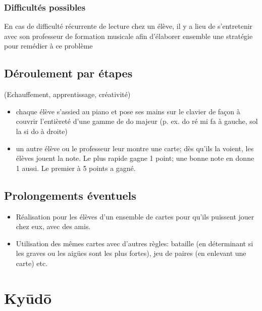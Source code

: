 \documentclass[a4paper,11pt,bibliography=totoc,numbers=noenddot,listof=flat,DIV=11,BCOR=0mm]{scrreprt}%
\begin{document}
\subsection*{Difficultés possibles}
En cas de difficulté récurrente de lecture chez un élève, il y a lieu de s'entretenir avec son professeur de formation musicale afin d'élaborer ensemble une stratégie pour remédier à ce problème

\section*{Déroulement par étapes}
(Echauffement, apprentissage, créativité)
\begin{itemize}
\item chaque élève s'assied au piano et pose ses mains sur le clavier de façon à couvrir l'entièreté d'une gamme de do majeur (p. ex. do ré mi fa à gauche, sol la si do à droite)
\item un autre élève ou le professeur leur montre une carte; dès qu'ils la voient, les élèves jouent la note. Le plus rapide gagne 1 point; une bonne note en donne 1 aussi. Le premier à 5 points a gagné.
\end{itemize}


%

\section*{Prolongements éventuels}
\begin{itemize}
\item [\textbullet] Réalisation pour les élèves d'un ensemble de cartes pour qu'ils puissent jouer chez eux, avec des amis.
\item [\textbullet] Utilisation des mêmes cartes avec d'autres règles: bataille (en déterminant si les graves ou les aigües sont les plus fortes), jeu de paires (en enlevant une carte) etc.

\end{itemize}


\chapter[Jeu musical: Ky\={u}d\={o}]{Ky\={u}d\={o}}
\end{document}
